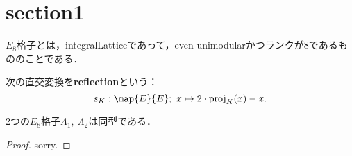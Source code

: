 %

\section{section1}
\begin{definition}
  \label{def:E8Lattice}
  \leanok
  $E_8$格子とは，integralLatticeであって，even unimodularかつランクが$8$であるもののことである．
\end{definition}

\begin{definition}
  \label{defi:reflection}
  \leanok
  次の直交変換を\textbf{reflection}という：
  \begin{equation}
    s_K : \map{E}{E};\ x \mapsto 2 \cdot \operatorname{proj}_K(x) - x.
  \end{equation}
\end{definition}

\begin{theorem}
  \label{thm:unique}
  \leanok
  2つの$E_8$格子$\Lambda_1,\ \Lambda_2$は同型である．
\end{theorem}

\begin{proof}
  sorry.
\end{proof}

